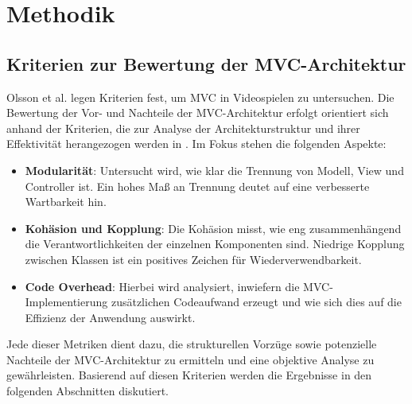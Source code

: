 
\chapter{Methodik}
\label{chap:methodik}

\section{Kriterien zur Bewertung der MVC-Architektur}

Olsson et al. \cite{olsson2015evolution} legen Kriterien fest, um 
MVC in Videospielen zu untersuchen.
Die Bewertung der Vor- und Nachteile der MVC-Architektur erfolgt orientiert 
sich anhand der Kriterien, die zur Analyse der Architekturstruktur und ihrer 
Effektivität herangezogen werden in \cite{olsson2015evolution}. Im Fokus stehen 
die folgenden Aspekte:

\begin{itemize}
    \item \textbf{Modularität}: Untersucht wird, wie klar die Trennung 
    von Modell, View und Controller ist. Ein hohes Maß an Trennung 
    deutet auf eine verbesserte Wartbarkeit hin.
    
    \item \textbf{Kohäsion und Kopplung}: Die Kohäsion misst, wie 
    eng zusammenhängend die Verantwortlichkeiten der einzelnen 
    Komponenten sind. Niedrige Kopplung zwischen Klassen ist ein 
    positives Zeichen für Wiederverwendbarkeit.
    
    \item \textbf{Code Overhead}: Hierbei wird analysiert, inwiefern 
    die MVC-Implementierung zusätzlichen Codeaufwand erzeugt und 
    wie sich dies auf die Effizienz der Anwendung auswirkt.
\end{itemize}

Jede dieser Metriken dient dazu, die strukturellen Vorzüge sowie 
potenzielle Nachteile der MVC-Architektur zu ermitteln und eine 
objektive Analyse zu gewährleisten. Basierend auf diesen Kriterien 
werden die Ergebnisse in den folgenden Abschnitten diskutiert.